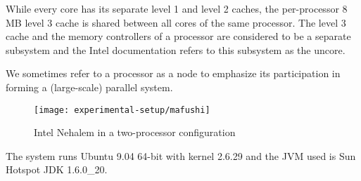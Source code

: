 While every core has its separate level 1 and level 2 caches, the
per-processor 8 MB level 3 cache is shared between all cores of the
same processor. The level 3 cache and the memory controllers of a
processor are considered to be a separate subsystem and the Intel
documentation refers to this subsystem as the uncore.

We sometimes refer to a processor as a node to emphasize its
participation in forming a (large-scale) parallel system.

\begin{figure}[htb]
  \centering
  \texttt{[image: experimental-setup/mafushi]}
  \caption[Intel Nehalem in a two-processor configuration]{Intel
    Nehalem in a two-processor configuration}
  \label{fig:experimental-setup-mafushi}
\end{figure}

The system runs Ubuntu 9.04 64-bit with kernel 2.6.29 and the JVM used
is Sun Hotspot JDK 1.6.0\_20.


